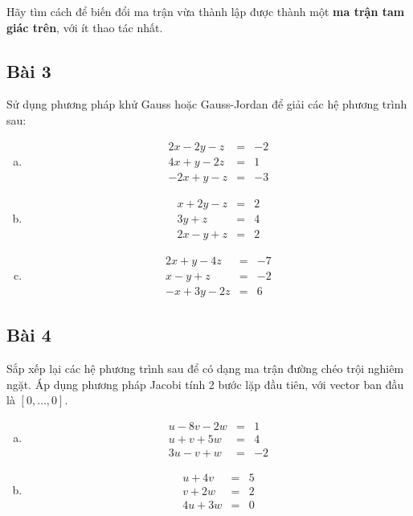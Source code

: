 \documentclass[12pt]{article}
\begin{document}
Hãy tìm cách để biến đổi ma trận vừa thành lập được thành một \textbf{ma trận tam giác trên}, với ít thao tác nhất.

\subsection{Bài 3}

Sử dụng phương pháp khử Gauss hoặc Gauss-Jordan để giải các hệ phương trình sau:

\begin{enumerate}[a)]
\item 
\begin{eqnarray*}
    2x -2y -z &=& -2\\
    4x + y -2z &=& 1\\
    -2x + y -z &=& -3
  \end{eqnarray*}


\item 
  \begin{eqnarray*}
    x + 2y -z &=& 2\\
       3y + z &=& 4\\
    2x -y + z &=& 2
  \end{eqnarray*}


\item 
  \begin{eqnarray*}
    2x + y -4z &=& -7\\
    x -y +z &=& -2\\
    -x + 3y - 2z &=& 6
  \end{eqnarray*}

\end{enumerate}


\subsection{Bài 4}

Sắp xếp lại các hệ phương trình sau để có dạng ma trận đường chéo trội nghiêm ngặt. Áp dụng phương pháp Jacobi tính 2 bước lặp đầu tiên, với vector ban đầu là $[0,\ldots,0]$.

\begin{enumerate}[a)]

\item

  \begin{eqnarray*}
    u - 8v -2w &=& 1\\
    u + v + 5w &=& 4 \\
    3u - v + w &=& -2
  \end{eqnarray*}
    
\item  
 \begin{eqnarray*}
    u + 4v &=& 5\\
    v + 2w &=& 2\\
    4u + 3w&=& 0
  \end{eqnarray*}
  
\end{enumerate}
\end{document}
